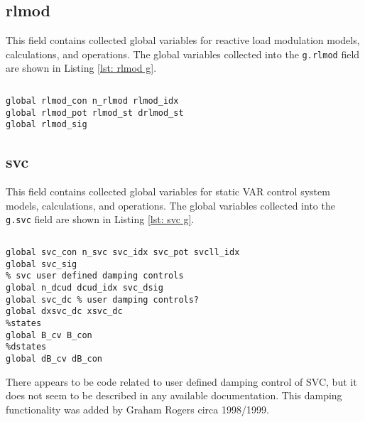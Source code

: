 \pagebreak
\subsection{rlmod}
This field contains collected global variables for reactive load modulation models, calculations, and operations.
The global variables collected into the \verb|g.rlmod| field are shown in Listing \ref{lst: rlmod g}.

\begin{lstlisting}[caption={Reactive Load Modulation Global Field Variables},label={lst: rlmod g}]
\end{lstlisting}\vspace{-2 em}
\begin{verbatim}
global rlmod_con n_rlmod rlmod_idx
global rlmod_pot rlmod_st drlmod_st
global rlmod_sig
\end{verbatim}

\subsection{svc}
This field contains collected global variables for static VAR control system models, calculations, and operations.
The global variables collected into the \verb|g.svc| field are shown in Listing \ref{lst: svc g}.

\begin{lstlisting}[caption={SVC Global Field Variables},label={lst: svc g}]
\end{lstlisting}\vspace{-2 em}
\begin{verbatim}
global svc_con n_svc svc_idx svc_pot svcll_idx
global svc_sig
% svc user defined damping controls
global n_dcud dcud_idx svc_dsig
global svc_dc % user damping controls?
global dxsvc_dc xsvc_dc
%states
global B_cv B_con
%dstates
global dB_cv dB_con
\end{verbatim}

There appears to be code related to user defined damping control of SVC, but it does not seem to be described in any available documentation. 
This damping functionality was added by Graham Rogers circa 1998/1999.

